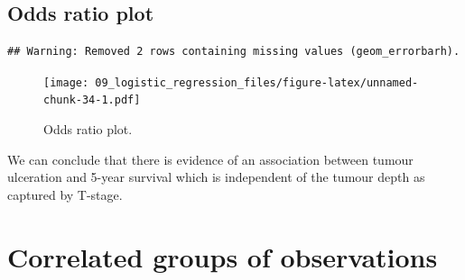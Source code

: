 \documentclass[
  12pt,
  krantz2]{krantz}
\makeatletter
\newenvironment{Shaded}{\begin{snugshade}}{\end{snugshade}}
\newcommand{\DataTypeTok}[1]{\textcolor[rgb]{0.13,0.29,0.53}{#1}}
\newcommand{\DecValTok}[1]{\textcolor[rgb]{0.00,0.00,0.81}{#1}}
\newcommand{\FloatTok}[1]{\textcolor[rgb]{0.00,0.00,0.81}{#1}}
\newcommand{\KeywordTok}[1]{\textcolor[rgb]{0.13,0.29,0.53}{\textbf{#1}}}
\newcommand{\NormalTok}[1]{#1}
\newcommand{\OperatorTok}[1]{\textcolor[rgb]{0.81,0.36,0.00}{\textbf{#1}}}
\newcommand{\StringTok}[1]{\textcolor[rgb]{0.31,0.60,0.02}{#1}}
\newenvironment{kframe}{%
\medskip{}
\setlength{\fboxsep}{.8em}
 \def\at@end@of@kframe{}%
 \ifinner\ifhmode%
  \def\at@end@of@kframe{\end{minipage}}%
  \begin{minipage}{\columnwidth}%
 \fi\fi%
 \def\FrameCommand##1{\hskip\@totalleftmargin \hskip-\fboxsep
 \colorbox{shadecolor}{##1}\hskip-\fboxsep
     \hskip-\linewidth \hskip-\@totalleftmargin \hskip\columnwidth}%
 \MakeFramed {\advance\hsize-\width
   \@totalleftmargin\z@ \linewidth\hsize
   \@setminipage}}%
 {\par\unskip\endMakeFramed%
 \at@end@of@kframe}
\renewenvironment{Shaded}{\begin{kframe}}{\end{kframe}}
\makeatother
\begin{document}
\hypertarget{odds-ratio-plot}{%
\subsection{Odds ratio plot}\label{odds-ratio-plot}}


\begin{Shaded}
\end{Shaded}

\begin{verbatim}
## Warning: Removed 2 rows containing missing values (geom_errorbarh).
\end{verbatim}

\begin{figure}
\centering
\texttt{[image: 09\_logistic\_regression\_files/figure-latex/unnamed-chunk-34-1.pdf]}
\caption{\label{fig:unnamed-chunk-34}Odds ratio plot.}
\end{figure}


We can conclude that there is evidence of an association between tumour ulceration and 5-year survival which is independent of the tumour depth as captured by T-stage.

\hypertarget{correlated-groups-of-observations}{%
\section{Correlated groups of observations}\label{correlated-groups-of-observations}}
\end{document}
